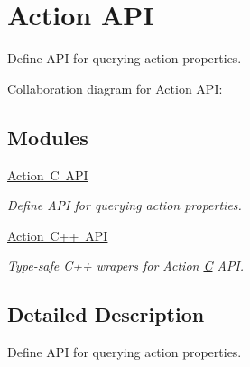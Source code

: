 \hypertarget{group__actionapi}{}\section{Action A\+PI}
\label{group__actionapi}


Define A\+PI for querying action properties.  


Collaboration diagram for Action A\+PI\+:
\subsection*{Modules}
\begin{DoxyCompactItemize}
\item 
\mbox{\hyperlink{group__actioncapi}{Action C A\+PI}}
\begin{DoxyCompactList}\small\item\em Define A\+PI for querying action properties. \end{DoxyCompactList}\item 
\mbox{\hyperlink{group__actioncppapi}{Action C++ A\+PI}}
\begin{DoxyCompactList}\small\item\em Type-\/safe C++ wrapers for Action \mbox{\hyperlink{struct_c}{C}} A\+PI. \end{DoxyCompactList}\end{DoxyCompactItemize}


\subsection{Detailed Description}
Define A\+PI for querying action properties. 

